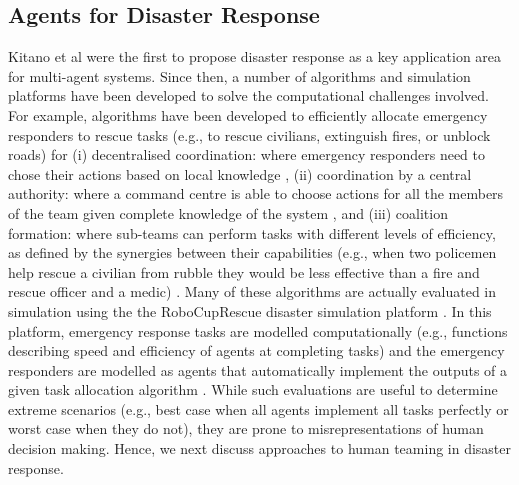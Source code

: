 \subsection{Agents for Disaster Response}\label{sec:agents disasters}
Kitano et al \cite{kitano:2001} were the first to propose disaster response as a key application area for multi-agent systems. Since then, a number of algorithms and simulation platforms have been developed to solve the computational challenges involved. For example, algorithms  have been developed to efficiently allocate emergency responders to rescue tasks (e.g., to rescue civilians, extinguish fires, or unblock roads) for (i) decentralised coordination: where emergency responders need to chose their actions based on local knowledge \cite{Chapman2009,puyol:etal:2014}, (ii)  coordination by a central authority: where a command centre is able to choose actions for all the members of the team given complete knowledge of the system \cite{koes2006constraint,Scerri2005,Khan-2011-JAAMAS} , and (iii) coalition formation: where sub-teams can perform tasks with different levels of efficiency, as defined by the synergies between their capabilities (e.g., when two policemen help rescue a civilian from rubble they would be less effective than a fire and rescue officer and a medic) \cite{Ramchurn:etal}. Many of these algorithms are actually evaluated in simulation using the the RoboCupRescue disaster simulation platform \cite{skinner:ramchurn:2010}. In this platform, emergency response tasks are modelled computationally (e.g., functions describing speed and efficiency of agents at completing tasks) and the emergency responders are modelled as agents that automatically implement the outputs of a given task allocation algorithm \cite{kleiner:etal:2013,ramchurn:etal:2010}. While such evaluations are useful to determine extreme scenarios (e.g., best case when all agents implement all tasks perfectly or worst case when they do not), they are prone to misrepresentations of human decision making. Hence, we next discuss approaches to human teaming in disaster response.


